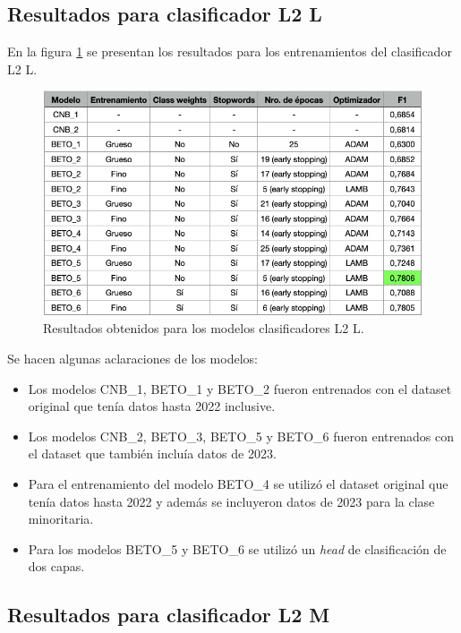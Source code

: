 \subsection{Resultados para clasificador L2 L}

En la figura \ref{fig:res-l2l} se presentan los resultados para los entrenamientos del clasificador L2 L.

\begin{figure}[htbp]
	\centering
	\includegraphics[width=1\textwidth]{./Figures/cap4-resultados-l2l.png}
	\caption{Resultados obtenidos para los modelos clasificadores L2 L.}
	\label{fig:res-l2l}
\end{figure}

Se hacen algunas aclaraciones de los modelos:
\begin{itemize}
	\item Los modelos CNB\_1, BETO\_1 y BETO\_2 fueron entrenados con el dataset original que tenía datos hasta 2022 inclusive.
	\item Los modelos CNB\_2, BETO\_3, BETO\_5 y BETO\_6 fueron entrenados con el dataset que también incluía datos de 2023.
	\item Para el entrenamiento del modelo BETO\_4 se utilizó el dataset original que tenía datos hasta 2022 y además se incluyeron datos de 2023 para la clase minoritaria.
	\item Para los modelos BETO\_5 y BETO\_6 se utilizó un \textit{head} de clasificación de dos capas.
\end{itemize}

\subsection{Resultados para clasificador L2 M}

